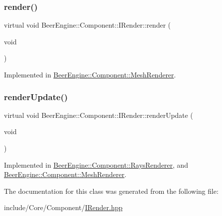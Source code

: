 \subsubsection{\texorpdfstring{render()}{render()}}
{\footnotesize\ttfamily virtual void Beer\+Engine\+::\+Component\+::\+I\+Render\+::render (\begin{DoxyParamCaption}\item[{void}]{ }\end{DoxyParamCaption})\hspace{0.3cm}{\ttfamily [pure virtual]}}



Implemented in \mbox{\hyperlink{class_beer_engine_1_1_component_1_1_mesh_renderer_ace87e6038f061bf1815f047f4bc0c6e8}{Beer\+Engine\+::\+Component\+::\+Mesh\+Renderer}}.

\mbox{\label{class_beer_engine_1_1_component_1_1_i_render_aef1ff4ddcdf216d290c747edd86bd99e}} 
\subsubsection{\texorpdfstring{render\+Update()}{renderUpdate()}}
{\footnotesize\ttfamily virtual void Beer\+Engine\+::\+Component\+::\+I\+Render\+::render\+Update (\begin{DoxyParamCaption}\item[{void}]{ }\end{DoxyParamCaption})\hspace{0.3cm}{\ttfamily [pure virtual]}}



Implemented in \mbox{\hyperlink{class_beer_engine_1_1_component_1_1_rays_renderer_a1647c9a5f40fc9186ccb6d55b7ebfe5e}{Beer\+Engine\+::\+Component\+::\+Rays\+Renderer}}, and \mbox{\hyperlink{class_beer_engine_1_1_component_1_1_mesh_renderer_abca4caa865363fdccb1b0c6fc6f7c81d}{Beer\+Engine\+::\+Component\+::\+Mesh\+Renderer}}.



The documentation for this class was generated from the following file\+:\begin{DoxyCompactItemize}
\item 
include/\+Core/\+Component/\mbox{\hyperlink{_i_render_8hpp}{I\+Render.\+hpp}}\end{DoxyCompactItemize}
